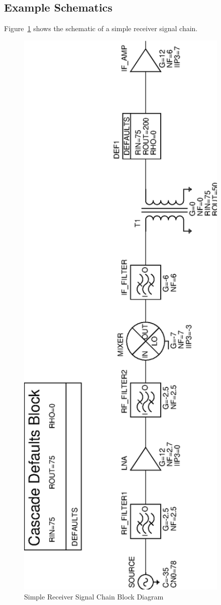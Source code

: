 \documentclass{article}
\begin{document}
\subsection{Example Schematics}
Figure~\ref{fig:ckt} shows the
schematic of a simple receiver signal chain.
\begin{figure}
\begin{center}
\includegraphics[angle=270,width=4in]{example.eps}
\end{center}
\caption{Simple Receiver Signal Chain Block Diagram}
\label{fig:ckt}
\end{figure}
\end{document}
